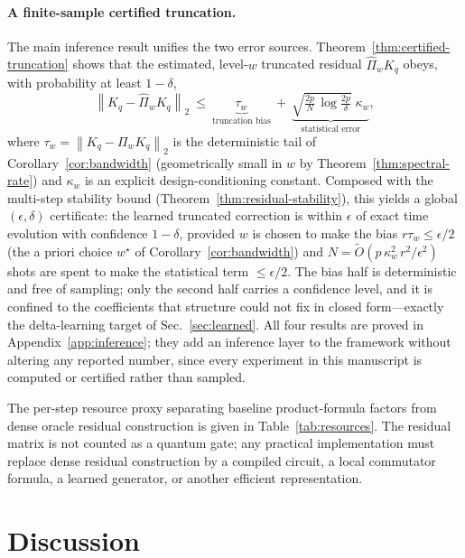 \documentclass[aps,prresearch,reprint,superscriptaddress,nofootinbib,amsmath,amssymb]{revtex4-2}
\newcommand{\norm}[1]{\left\lVert #1 \right\rVert}
\begin{document}
\paragraph{A finite-sample certified truncation.} The main inference result unifies the two error sources. Theorem~\ref{thm:certified-truncation} shows that the estimated, level-$w$ truncated residual $\widehat\Pi_wK_q$ obeys, with probability at least $1-\delta$,
\begin{equation}
    \norm{K_q-\widehat\Pi_wK_q}_2\ \le\ \underbrace{\tau_w}_{\text{truncation bias}}\ +\ \underbrace{\sqrt{\tfrac{2p}{N}\,\log\tfrac{2p}{\delta}}\;\kappa_w}_{\text{statistical error}},
    \label{eq:certified-truncation-intro}
\end{equation}
where $\tau_w=\norm{K_q-\Pi_wK_q}_2$ is the deterministic tail of Corollary~\ref{cor:bandwidth} (geometrically small in $w$ by Theorem~\ref{thm:spectral-rate}) and $\kappa_w$ is an explicit design-conditioning constant. Composed with the multi-step stability bound (Theorem~\ref{thm:residual-stability}), this yields a global $(\epsilon,\delta)$ certificate: the learned truncated correction is within $\epsilon$ of exact time evolution with confidence $1-\delta$, provided $w$ is chosen to make the bias $r\tau_w\le\epsilon/2$ (the a priori choice $w^\star$ of Corollary~\ref{cor:bandwidth}) and $N=\tilde O(p\,\kappa_w^2\,r^2/\epsilon^2)$ shots are spent to make the statistical term $\le\epsilon/2$. The bias half is deterministic and free of sampling; only the second half carries a confidence level, and it is confined to the coefficients that structure could not fix in closed form---exactly the delta-learning target of Sec.~\ref{sec:learned}. All four results are proved in Appendix~\ref{app:inference}; they add an inference layer to the framework without altering any reported number, since every experiment in this manuscript is computed or certified rather than sampled.

The per-step resource proxy separating baseline product-formula factors from dense oracle residual construction is given in Table~\ref{tab:resources}. The residual matrix is not counted as a quantum gate; any practical implementation must replace dense residual construction by a compiled circuit, a local commutator formula, a learned generator, or another efficient representation.


\section{Discussion}
\label{sec:discussion}
\end{document}
